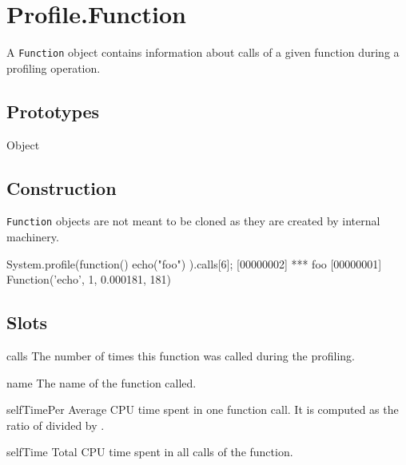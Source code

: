 
\section{Profile.Function}

A \lstinline|Function| object contains information about calls of a
given function during a profiling operation.

\subsection{Prototypes}

\begin{refObjects}
\item[Object]
\end{refObjects}

\subsection{Construction}

\lstinline|Function| objects are not meant to be cloned as they are
created by  internal machinery.

\begin{urbiscript}
System.profile(function() { echo("foo") }).calls[6];
[00000002] *** foo
[00000001] Function('echo', 1, 0.000181, 181)
\end{urbiscript}

\subsection{Slots}

\begin{urbiscriptapi}

\item[calls]%
  The number of times this function was called during the profiling.

\item[name]%
  The name of the function called.

\item[selfTimePer]%
  Average CPU time spent in one function call. It is computed as the ratio
  of  divided by .

\item[selfTime]%
  Total CPU time spent in all calls of the function.

\end{urbiscriptapi}


